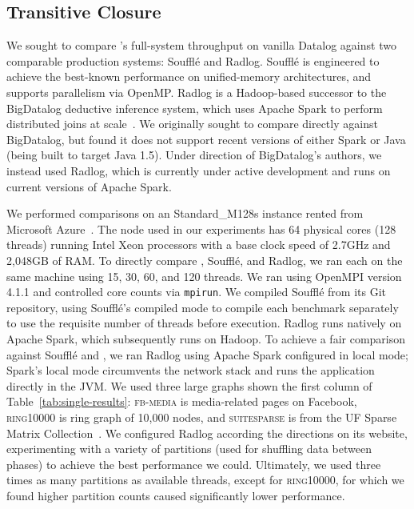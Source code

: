 \subsection{Transitive Closure}
\label{sec:eval:tc}
\label{sec:eval:pb1}

We sought to compare \slog{}'s full-system throughput on vanilla
Datalog against two comparable production systems: Souffl\'e and
Radlog. Souffl\'e is engineered to achieve the best-known performance
on unified-memory architectures, and supports parallelism via
OpenMP. Radlog is a Hadoop-based successor to the BigDatalog deductive
inference system, which uses Apache Spark to perform distributed joins
at scale~\cite{rasql}. We originally sought to compare \slog{}
directly against BigDatalog, but found it does not support recent
versions of either Spark or Java (being built to target Java
1.5). Under direction of BigDatalog's authors, we instead used Radlog,
which is currently under active development and runs on current
versions of Apache Spark.

We performed comparisons on an \textsf{Standard\_M128s} instance
rented from Microsoft Azure~\cite{mseries}. The node used in our
experiments has 64 physical cores (128 threads) running Intel Xeon
processors with a base clock speed of 2.7GHz and 2,048GB of RAM. To
directly compare \slog{}, Souffl\'e, and Radlog, we ran each on the
same machine using 15, 30, 60, and 120 threads. We ran \slog{} using
OpenMPI version 4.1.1 and controlled core counts via
\texttt{mpirun}. We compiled Souffl\'e from its Git repository, using
Souffl\'e's compiled mode to compile each benchmark separately to use
the requisite number of threads before execution. Radlog runs natively
on Apache Spark, which subsequently runs on Hadoop. To achieve a fair
comparison against Souffl\'e and \slog{}, we ran Radlog using Apache
Spark configured in local mode; Spark's local mode circumvents the
network stack and runs the application directly in the JVM. We used
three large graphs shown the first column of Table~\ref{tab:single-results}:
\textsc{fb-media} is media-related pages on Facebook,
\textsc{ring10000} is ring graph of 10,000 nodes, and
\textsc{suitesparse} is from the UF Sparse Matrix
Collection~\cite{Davis:2011:UFS:2049662.2049663}. We configured Radlog
according the directions on its website, experimenting with a variety
of partitions (used for shuffling data between phases) to achieve the
best performance we could. Ultimately, we used three times as many
partitions as available threads, except for \textsc{ring10000}, for
which we found higher partition counts caused significantly lower
performance.

